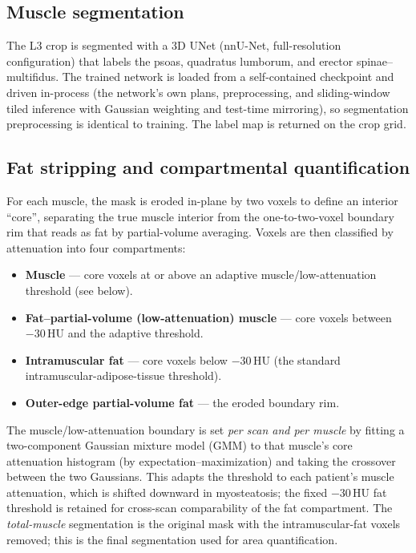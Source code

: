 \documentclass{article}
\begin{document}
\subsection{Muscle segmentation}
The L3 crop is segmented with a 3D UNet (nnU-Net, full-resolution
configuration) that labels the psoas, quadratus lumborum, and erector
spinae--multifidus. The trained network is loaded from a self-contained
checkpoint and driven in-process (the network's own plans, preprocessing, and
sliding-window tiled inference with Gaussian weighting and test-time mirroring),
so segmentation preprocessing is identical to training. The label map is
returned on the crop grid.

\subsection{Fat stripping and compartmental quantification}
For each muscle, the mask is eroded in-plane by two voxels to define an interior
``core'', separating the true muscle interior from the one-to-two-voxel boundary
rim that reads as fat by partial-volume averaging. Voxels are then classified by
attenuation into four compartments:
\begin{itemize}
  \item \textbf{Muscle} --- core voxels at or above an adaptive
        muscle/low-attenuation threshold (see below).
  \item \textbf{Fat--partial-volume (low-attenuation) muscle} --- core voxels
        between $-30$\,HU and the adaptive threshold.
  \item \textbf{Intramuscular fat} --- core voxels below $-30$\,HU (the
        standard intramuscular-adipose-tissue threshold).
  \item \textbf{Outer-edge partial-volume fat} --- the eroded boundary rim.
\end{itemize}
The muscle/low-attenuation boundary is set \emph{per scan and per muscle} by
fitting a two-component Gaussian mixture model (GMM) to that muscle's core
attenuation histogram (by expectation--maximization) and taking the crossover
between the two Gaussians. This adapts the threshold to each patient's muscle
attenuation, which is shifted downward in myosteatosis; the fixed
$-30$\,HU fat threshold is retained for cross-scan comparability of the fat
compartment. The \emph{total-muscle} segmentation is the original mask with the
intramuscular-fat voxels removed; this is the final segmentation used for
area quantification.
\end{document}
